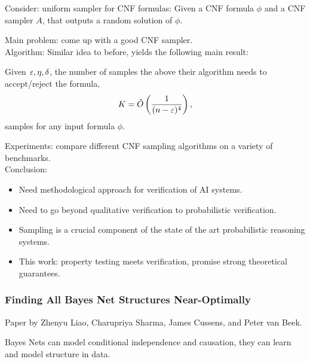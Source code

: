 Consider: uniform sampler for CNF formulas: Given a CNF formula $\phi$ and a CNF sampler $A$, that outputs a random solution of $\phi$.


Main problem: come up with a good CNF sampler. \\

Algorithm: Similar idea to before, yields the following main result:
\begin{theorem}
Given $\varepsilon, \eta, \delta$, the number of samples the above their algorithm needs to accept/reject the formula,
\[
K = \tilde{O}\left(\frac{1}{(n-\varepsilon)^4}\right),
\]
samples for any input formula $\phi$.
\end{theorem}

Experiments: compare different CNF sampling algorithms on a variety of benchmarks. \\

Conclusion:
\begin{itemize}
    \item Need methodological approach for verification of AI systems.
    \item Need to go beyond qualitative verification to probabilistic verification.
    \item Sampling is a crucial component of the state of the art probabilistic reasoning systems.
    \item This work: property testing meets verification, promise strong theoretical guarantees.
\end{itemize}




\spacerule
\subsubsection{Finding All Bayes Net Structures Near-Optimally~\cite{liao2018finding}}

Paper by Zhenyu Liao, Charupriya Sharma, James Cussens, and Peter van Beek. \\


Bayes Nets can model conditional independence and causation, they can learn and model structure in data. \\

